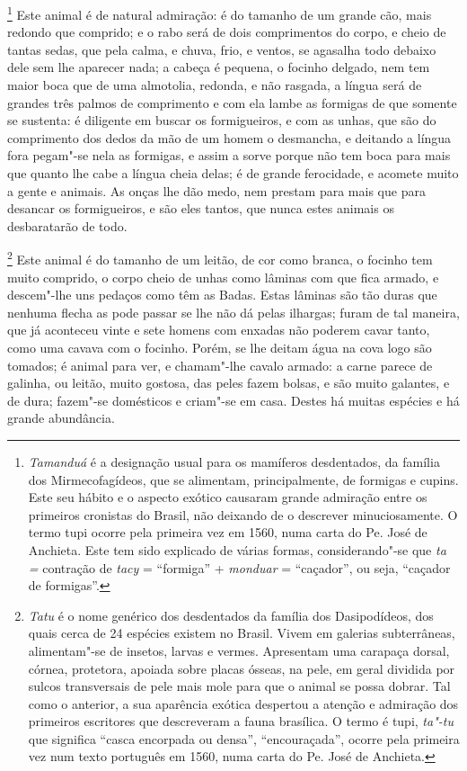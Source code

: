 \begin{linenumbers}
\footnote{ \textit{Tamanduá} é a designação
usual para os mamíferos desdentados, da família dos Mirmecofagídeos,
que se alimentam, principalmente, de formigas e cupins. Este seu hábito
e o aspecto exótico causaram grande admiração entre os primeiros
cronistas do Brasil, não deixando de o descrever minuciosamente. O
termo tupi ocorre pela primeira vez em 1560, numa carta do Pe.
José de Anchieta. Este tem sido explicado de várias formas,
considerando"-se que \textit{ta =} contração de \textit{tacy} = 
``formiga'' + \textit{monduar} = ``caçador'', ou seja, ``caçador de
formigas''.} Este animal é de natural admiração: é do tamanho
de um grande cão, mais redondo que comprido; e o rabo será de dois
comprimentos do corpo, e cheio de tantas sedas, que pela calma, e
chuva, frio, e ventos, se agasalha todo debaixo dele sem lhe aparecer
nada; a cabeça é pequena, o focinho delgado, nem tem maior boca que de
uma almotolia, redonda, e não rasgada, a língua será de grandes três
palmos de comprimento e com ela lambe as formigas de que somente se
sustenta: é diligente em buscar os formigueiros, e com as unhas, que
são do comprimento dos dedos da mão de um homem o desmancha, e deitando
a língua fora pegam"-se nela as formigas, e assim a sorve porque não tem
boca para mais que quanto lhe cabe a língua cheia delas; é de grande
ferocidade, e acomete muito a gente e animais. As onças lhe dão medo,
nem prestam para mais que para desancar os formigueiros, e são eles
tantos, que nunca estes animais os desbaratarão de todo.

\footnote{ \textit{Tatu} é o nome genérico dos
desdentados da família dos Dasipodídeos, dos quais cerca de 24 
espécies existem no Brasil. Vivem em galerias subterrâneas,
alimentam"-se de insetos, larvas e vermes. Apresentam uma carapaça
dorsal, córnea, protetora, apoiada sobre placas ósseas, na pele, em
geral dividida por sulcos transversais de pele mais mole para que o
animal se possa dobrar. Tal como o anterior, a sua aparência exótica
despertou a atenção e admiração dos primeiros escritores que
descreveram a fauna brasílica. O termo é tupi, \textit{ta"-tu} que
significa ``casca encorpada ou densa'', ``encouraçada'', ocorre pela
primeira vez num texto português em 1560, numa carta do Pe.
José de Anchieta.} Este animal é do tamanho de um leitão, de
cor como branca, o focinho tem muito comprido, o corpo cheio de unhas
como lâminas com que fica armado, e descem"-lhe uns pedaços como têm as
Badas. Estas lâminas são tão duras que nenhuma flecha as pode passar se
lhe não dá pelas ilhargas; furam de tal maneira, que já aconteceu vinte
e sete homens com enxadas não poderem cavar tanto, como uma cavava com
o focinho. Porém, se lhe deitam água na cova logo são tomados; é animal
para ver, e chamam"-lhe cavalo armado: a carne parece de galinha, ou
leitão, muito gostosa, das peles fazem bolsas, e são muito galantes, e
de dura; fazem"-se domésticos e criam"-se em casa.
 Destes há muitas espécies e há grande abundância.


\end{linenumbers}
